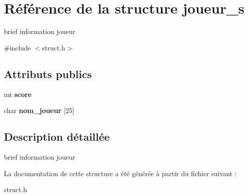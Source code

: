 \hypertarget{structjoueur__s}{}\section{Référence de la structure joueur\+\_\+s}
\label{structjoueur__s}


brief information joueur  




{\ttfamily \#include $<$struct.\+h$>$}

\subsection*{Attributs publics}
\begin{DoxyCompactItemize}
\item 
int {\bfseries score}\hypertarget{structjoueur__s_a403729367527db1e5b348a6e82dee49b}{}\label{structjoueur__s_a403729367527db1e5b348a6e82dee49b}

\item 
char {\bfseries nom\+\_\+joueur} \mbox{[}25\mbox{]}\hypertarget{structjoueur__s_a6bc122cdcd66bdcd44e0d774f0a6c34f}{}\label{structjoueur__s_a6bc122cdcd66bdcd44e0d774f0a6c34f}

\end{DoxyCompactItemize}


\subsection{Description détaillée}
brief information joueur 

La documentation de cette structure a été générée à partir du fichier suivant \+:\begin{DoxyCompactItemize}
\item 
struct.\+h\end{DoxyCompactItemize}
